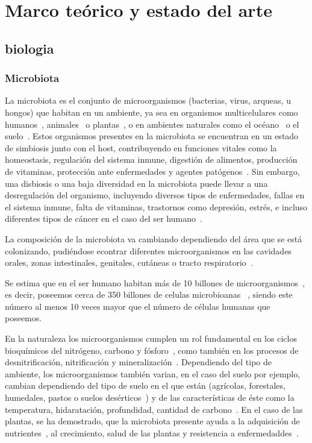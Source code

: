 \chapter{Marco teórico y estado del arte}
\section{biologia}
\subsection{Microbiota}
La microbiota es el conjunto de microorganismos (bacterias, virus, arqueas, u hongos) que habitan en un ambiente, ya sea en organismos multicelulares como humanos~\cite{gilbert2018current}, animales~\cite{bahrndorff2016microbiome} o plantas~\cite{berendsen2012rhizosphere}, o en ambientes naturales como el océano~\cite{doi:10.1126/science.aac8455} o el suelo~\cite{banerjee2023soil}. Estos organismos presentes en la microbiota se encuentran en un estado de simbiosis junto con el host, contribuyendo en funciones vitales como la homeostasis, regulación del sistema inmune, digestión de alimentos, producción de vitaminas, protección ante enfermedades y agentes patógenos~\cite{marco2021defining,fijan2014microorganisms,altvecs2020interaction,hou2022microbiota}. Sin embargo, una disbiosis o una baja diversidad en la microbiota puede llevar a una desregulación del organismo, incluyendo diversos tipos de enfermedades, fallas en el sistema inmune, falta de vitaminas, trastornos como depresión, estrés, e incluso diferentes tipos de cáncer en el caso del ser humano~\cite{altvecs2020interaction,hou2022microbiota}.

La composición de la microbiota va cambiando dependiendo del área que se está colonizando, pudiéndose econtrar diferentes microorganismos en las cavidades orales, zonas intestinales, genitales, cutáneas o tracto respiratorio~\cite{ursell2012interpersonal}.

Se estima que en el ser humano habitan más de 10 billones de microorganismos~\cite{sender2016revised}, es decir, poseemos cerca de 350 billones de celulas microbioanas~\cite{fijan2014microorganisms,ley2006ecological} , siendo este número al menos 10 veces mayor que el número de células humanas que poseemos.

En la naturaleza los microorganismos cumplen un rol fundamental en los ciclos bioquímicos del nitrógeno, carbono y fósforo~\cite{bitton1994role, gougoulias2014role}, como también en los procesos de desnitrificación, nitrificación y mineralización~\cite{bitton1994role, gougoulias2014role}. 
Dependiendo del tipo de ambiente, los microorganismos también varian, en el caso del suelo por ejemplo, cambian dependiendo del tipo de suelo en el que están (agrícolas, forestales, humedales, pastos o suelos desérticos~\cite{jiao2021linking}) y de las características de éste como la temperatura, hidaratación, profundidad, cantidad de carbono~\cite{bickel2020soil}.
En el caso de las plantas, se ha demostrado, que la microbiota presente ayuda a la adquisición de nutrientes~\cite{hu2017probiotic}, al crecimiento, salud de las plantas y resistencia a enfermedaddes~\cite{lemanceau2017let,hardoim2015hidden,vorholt2012microbial,COMPANT201929}.


